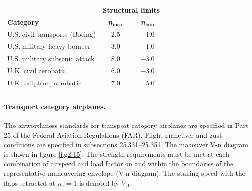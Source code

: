 \documentclass{AeroStructure-ERJohnson}
\begin{document}
\begin{table}[!h]
{\begin{tabular}{@{}lcc}\toprule
 & \multicolumn{2}{c}{\bf Structural limits}\\
 {\bf Category}	& {\bfseries\itshape n}$_{\textbf{max}}$ & {\bfseries\itshape n}$_{\textbf{min}}$\\\midrule
U.S. civil transports (Boeing) & 2.5 & $-1.0$\\
U.S. military heavy bomber	& 3.0 & $-1.0$\\
U.S. military subsonic attack	& 8.0 & $-3.0$\\
U.K. civil aerobatic & 6.0 & $-3.0$\\
U.K. sailplane, aerobatic & 7.0 & $-5.0$\\\botrule
\end{tabular}}{}
\vspace*{-16pt}
\end{table}

\paragraph{Transport category airplanes.}

The airworthiness standards for transport category airplanes are specified in Part 25 of the Federal Aviation Regulations (FAR). Flight maneuver and gust conditions are specified in subsections 25.331--25.351. The maneuver V-n diagram is shown in figure \ref{fig2.15}. The strength requirements must be met at each combination of airspeed and load factor on and within the boundaries of the representative maneuvering envelope (V-n diagram). The stalling speed with the flaps retracted at $n_{z}=1$ is denoted by $V_{s 1}$.

{\def\thefigure{2.15}
}
\end{document}
